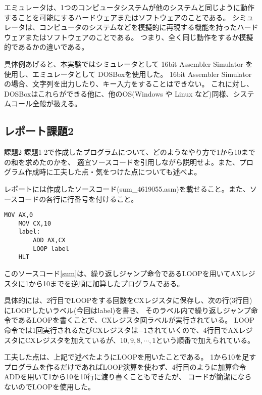\documentclass[12pt]{jarticle}
\begin{document}
エミュレータは、1つのコンピュータシステムが他のシステムと同じように動作することを可能にするハードウェアまたはソフトウェアのことである。
シミュレータは、コンピュータのシステムなどを模擬的に再現する機能を持ったハードウェアまたはソフトウェアのことである。
つまり、全く同じ動作をするか模擬的であるかの違いである。

具体例あげると、本実験ではシミュレータとして 16bit Assembler Simulator を使用し、エミュレータとして DOSBoxを使用した。
16bit Assembler Simulatorの場合、文字列を出力したり、キー入力をすることはできない。
これに対し、DOSBoxはこれらができる他に、他のOS(Windows や Linux など)同様、システムコール全般が扱える。

\subsection{レポート課題2}
\begin{itembox}[l]{課題2}
	課題1-2で作成したプログラムについて、どのようなやり方で1から10までの和を求めたのかを、
	適宜ソースコードを引用しながら説明せよ。また、プログラム作成時に工夫した点・気をつけた点についても述べよ。

	レポートには作成したソースコード(sum\_4619055.asm)を載せること。また、ソースコードの各行に行番号を付けること。
\end{itembox}
\begin{lstlisting}[caption=sum\_4619055.asm,label=sum]
	MOV AX,0
	MOV CX,10
	label:
		ADD AX,CX
		LOOP label
	HLT
\end{lstlisting}

このソースコード\ref{sum}は、繰り返しジャンプ命令であるLOOPを用いてAXレジスタに1から10までを逆順に加算したプログラムである。

具体的には、2行目でLOOPをする回数をCXレジスタに保存し、次の行(3行目)にLOOPしたいラベル(今回はlabel)を書き、
そのラベル内で繰り返しジャンプ命令であるLOOPを書くことで、CXレジスタ回ラベルが実行されている。
LOOP命令では1回実行されるたびCXレジスタは$-1$されていくので、4行目でAXレジスタにCXレジスタを加えているが、$10,9,8,\cdots,1$という順番で加えられている。

工夫した点は、上記で述べたようにLOOPを用いたことである。
1から10を足すプログラムを作るだけであればLOOP演算を使わず、4行目のように加算命令ADDを用いて1から10を10行に渡り書くこともできたが、
コードが簡潔にならないのでLOOPを使用した。
\end{document}
